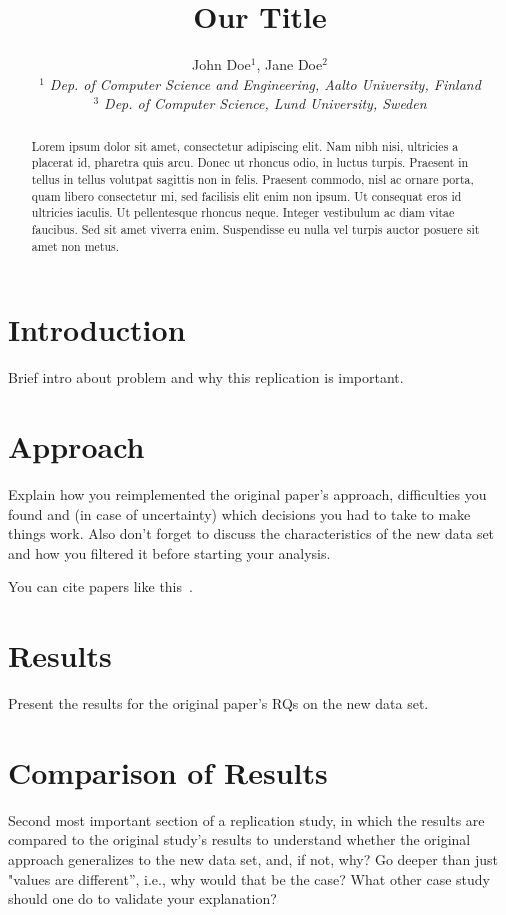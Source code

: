 \documentclass[10pt, conference]{IEEEtran}
\title{Our Title}
\author{John Doe$^{1}$, Jane Doe$^{2}$
    \\
    \emph{$^{1}$ Dep. of Computer Science and Engineering, Aalto University, Finland}
    \\
    \emph{$^{3}$ Dep. of Computer Science, Lund University, Sweden}}
\begin{document}
\maketitle

\begin{abstract}
Lorem ipsum dolor sit amet, consectetur adipiscing elit. Nam nibh nisi, ultricies a placerat id, pharetra quis arcu. Donec ut rhoncus odio, in luctus turpis. Praesent in tellus in tellus volutpat sagittis non in felis. Praesent commodo, nisl ac ornare porta, quam libero consectetur mi, sed facilisis elit enim non ipsum. Ut consequat eros id ultricies iaculis. Ut pellentesque rhoncus neque. Integer vestibulum ac diam vitae faucibus. Sed sit amet viverra enim. Suspendisse eu nulla vel turpis auctor posuere sit amet non metus.
\end{abstract}


\section{Introduction}
\label{sec:introduction}

Brief intro about problem and why this replication is important.


\section{Approach}
\label{sec:approach}

Explain how you reimplemented the original paper's approach, difficulties you found and (in case of uncertainty) which decisions you had to take to make things work. Also don't forget to discuss the characteristics of the new data set and how you filtered it before starting your analysis.

You can cite papers like this~\cite{humble10}.


\section{Results}
\label{sec:results}

Present the results for the original paper's RQs on the new data set.


\section{Comparison of Results}
\label{sec:comparison-results}

Second most important section of a replication study, in which the results are compared to the original study's results to understand whether the original approach generalizes to the new data set, and, if not, why? Go deeper than just "values are different'', i.e., why would that be the case? What other case study should one do to validate your explanation?
\end{document}
